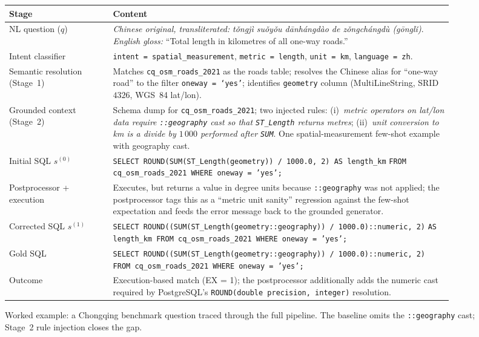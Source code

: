 \documentclass[11pt]{article}
\begin{document}
\begin{figure}[t]
\centering
\footnotesize
\begin{tabular}{@{}p{0.22\linewidth}p{0.72\linewidth}@{}}
\toprule
Stage & Content \\
\midrule
NL question ($q$) & \emph{Chinese original, transliterated:} \textit{t\v{o}ngj\`{i} su\v{o}y\v{o}u d\={a}nh\'{a}ngd\`{a}o de z\v{o}ngch\'{a}ngd\`{u} (g\={o}ngl\v{i})}. \emph{English gloss:} ``Total length in kilometres of all one-way roads.'' \\
\midrule
Intent classifier & \texttt{intent = spatial\_measurement}, \texttt{metric = length}, \texttt{unit = km}, \texttt{language = zh}. \\
\midrule
Semantic resolution (Stage~1) &
Matches \texttt{cq\_osm\_roads\_2021} as the roads table; resolves the Chinese alias for ``one-way road'' to the filter \texttt{oneway = `yes'}; identifies \texttt{geometry} column (MultiLineString, SRID $4326$, WGS~84 lat/lon). \\
\midrule
Grounded context (Stage~2) &
Schema dump for \texttt{cq\_osm\_roads\_2021}; two injected rules: (i)~\emph{metric operators on lat/lon data require \texttt{::geography} cast so that \texttt{ST\_Length} returns metres}; (ii)~\emph{unit conversion to km is a divide by $1\,000$ performed after \texttt{SUM}}. One spatial-measurement few-shot example with geography cast. \\
\midrule
Initial SQL $s^{(0)}$ &
\texttt{SELECT ROUND(SUM(ST\_Length(geometry)) / 1000.0, 2) AS length\_km}\newline
\texttt{FROM cq\_osm\_roads\_2021 WHERE oneway = 'yes';} \\
\midrule
Postprocessor + execution &
Executes, but returns a value in degree units because \texttt{::geography} was not applied; the postprocessor tags this as a ``metric unit sanity'' regression against the few-shot expectation and feeds the error message back to the grounded generator. \\
\midrule
Corrected SQL $s^{(1)}$ &
\texttt{SELECT ROUND((SUM(ST\_Length(geometry::geography)) / 1000.0)::numeric, 2)}\newline
\texttt{AS length\_km FROM cq\_osm\_roads\_2021 WHERE oneway = 'yes';} \\
\midrule
Gold SQL &
\texttt{SELECT ROUND((SUM(ST\_Length(geometry::geography)) / 1000.0)::numeric, 2)}\newline
\texttt{FROM cq\_osm\_roads\_2021 WHERE oneway = 'yes';} \\
\midrule
Outcome & Execution-based match (EX = 1); the postprocessor additionally adds the numeric cast required by PostgreSQL's \texttt{ROUND(double precision, integer)} resolution. \\
\bottomrule
\end{tabular}
\caption{Worked example: a Chongqing benchmark question traced through the full pipeline. The baseline omits the \texttt{::geography} cast; Stage~2 rule injection closes the gap.}
\label{fig:worked-example-suppl}
\end{figure}
\end{document}
